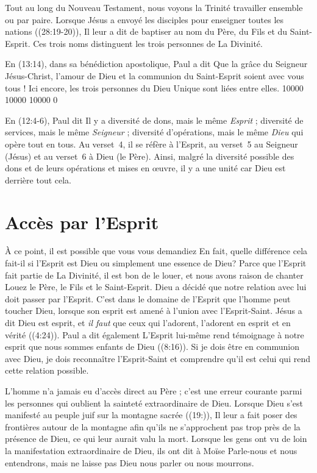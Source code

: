 Tout au long du Nouveau Testament, nous voyons la Trinité travailler ensemble
 ou par paire. Lorsque Jésus a envoyé les disciples pour enseigner toutes
 les nations ((28:19-20)), Il leur a dit de baptiser au nom
 du Père, du Fils et du Saint-Esprit. Ces trois noms distinguent les trois
 personnes de La Divinité.

En (13:14), dans sa bénédiction apostolique, Paul a dit\frcolon{}
 \Og Que la grâce du Seigneur Jésus-Christ, l'amour de Dieu et la communion
 du Saint-Esprit soient avec vous tous ! \Fg{}
 Ici encore, les trois personnes du Dieu Unique sont liées entre elles.
 \begingroup{} 10000 10000 10000 0
 \par\endgroup

En (12:4-6), Paul dit\frcolon{}
 \Og Il y a diversité de dons, mais le même \emph{Esprit} ; diversité de services,
 mais le même \emph{Seigneur} ; diversité d'opérations, mais le
 même \emph{Dieu} qui opère tout en tous. \Fg{}
 Au verset~4, il se réfère à l'Esprit,
 au verset~5 au Seigneur (Jésus)
 et au verset~6 à Dieu (le Père).
 Ainsi, malgré la diversité possible des dons et de leurs opérations
 et mises en \oe{}uvre, il y a une unité car Dieu est derrière tout cela.


\section{Acc\`es par l'Esprit}

À ce point, il est possible que vous vous demandiez\frcolon{}
 \Og En fait, quelle différence cela fait-il si l'Esprit est Dieu
 ou simplement une essence de Dieu? \Fg{}
 Parce que l'Esprit fait partie de La Divinité, il est bon de le louer,
 et nous avons raison de chanter\frcolon{}
 \Og Louez le Père, le Fils et le Saint-Esprit. \Fg{}
 Dieu a décidé que notre relation avec lui doit passer par
 l'Esprit. C'est dans le domaine de l'Esprit que l'homme peut toucher Dieu, lorsque
 son esprit est amené à l'union avec l'Esprit-Saint. Jésus a dit\frcolon{}
 \Og Dieu est esprit, et \emph{il faut} que ceux qui l'adorent, l'adorent en esprit
 et en vérité \Fg{} ((4:24)).
 Paul a dit également\frcolon{} \Og L'Esprit lui-même rend témoignage à notre esprit
 que nous sommes enfants de Dieu \Fg{} ((8:16)).
 Si je dois être en communion avec Dieu, je dois reconnaître l'Esprit-Saint
 et comprendre qu'il est celui qui rend cette relation possible.

L'homme n'a jamais eu d'accès direct au Père ; c'est une erreur courante parmi
 les personnes qui oublient la sainteté extraordinaire de Dieu.
 Lorsque Dieu s'est manifesté au peuple juif sur la montagne sacrée
 ((19:)), Il leur a fait poser des frontières autour de
 la montagne afin qu'ils ne s'approchent pas trop près de la présence
 de Dieu, ce qui leur aurait valu la mort.
 Lorsque les gens ont vu de loin la manifestation extraordinaire de Dieu,
 ils ont dit à Moïse\frcolon{}
 \Og Parle-nous et nous entendrons, mais ne laisse pas Dieu nous parler
 ou nous mourrons. \Fg{}

